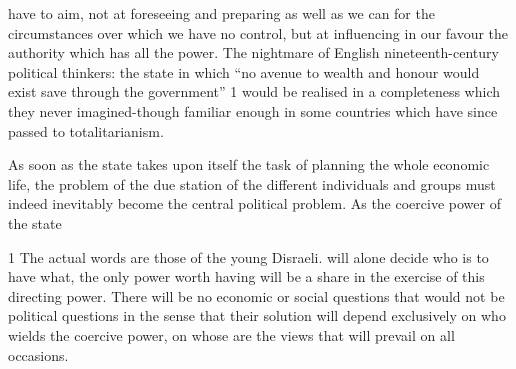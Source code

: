 \documentclass[11pt,openany]{book}
\begin{document}
have to aim, not at foreseeing and preparing as well as we can for the circumstances over which we have no control, but at influencing in our favour the authority which has all the power. The nightmare of English nineteenth-century political thinkers: the state in which ``no avenue to wealth and honour would exist save through the government'' 1 would be realised in a completeness which they never imagined-though familiar enough in some countries which have since passed to totalitarianism.

\begin{center}\textasteriskcentered\hspace{0.9em}\textasteriskcentered\hspace{0.9em}\textasteriskcentered\end{center}

\begin{center}\textasteriskcentered\hspace{0.9em}\textasteriskcentered\hspace{0.9em}\textasteriskcentered\end{center}

\begin{center}\textasteriskcentered\hspace{0.9em}\textasteriskcentered\hspace{0.9em}\textasteriskcentered\end{center}

\begin{center}\textasteriskcentered\hspace{0.9em}\textasteriskcentered\hspace{0.9em}\textasteriskcentered\end{center}

\begin{center}\textasteriskcentered\hspace{0.9em}\textasteriskcentered\hspace{0.9em}\textasteriskcentered\end{center}

As soon as the state takes upon itself the task of planning the whole economic life, the problem of the due station of the different individuals and groups must indeed inevitably become the central political problem. As the coercive power of the state

1 The actual words are those of the young Disraeli. will alone decide who is to have what, the only power worth having will be a share in the exercise of this directing power. There will be no economic or social questions that would not be political questions in the sense that their solution will depend exclusively on who wields the coercive power, on whose are the views that will prevail on all occasions.
\end{document}
